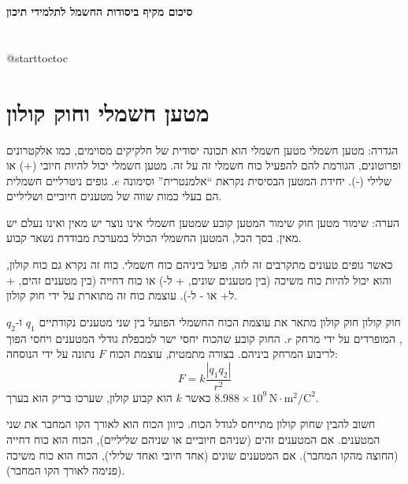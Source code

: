 \documentclass[12pt]{article}
\makeatletter
\newcommand{\enquote}[1]{\textquotedblleft #1\textquotedblright}
\renewcommand\tableofcontents{\section*{ \contentsname}
    @starttoc{toc}}
\makeatother
\begin{document}
\begin{center}
    \Large\bfseries סיכום מקיף ביסודות החשמל לתלמידי תיכון
\end{center}

\vspace{1em} %

\tableofcontents

\newpage %

\section{מטען חשמלי וחוק קולון}

\begin{definitionBox}{הגדרה: מטען חשמלי}
מטען חשמלי הוא תכונה יסודית של חלקיקים מסוימים, כמו אלקטרונים ופרוטונים, הגורמת להם להפעיל כוח חשמלי זה על זה. מטען חשמלי יכול להיות חיובי (+) או שלילי (-). יחידת המטען הבסיסית נקראת \enquote{אלמנטרית} וסימונה \(e\). גופים ניטרליים חשמלית הם בעלי כמות שווה של מטענים חיוביים ושליליים.
\end{definitionBox}

\begin{remarkBox}{הערה: שימור מטען}
חוק שימור המטען קובע שמטען חשמלי אינו נוצר יש מאין ואינו נעלם יש מאין. בסך הכל, המטען החשמלי הכולל במערכת מבודדת נשאר קבוע.
\end{remarkBox}

כאשר גופים טעונים מתקרבים זה לזה, פועל ביניהם כוח חשמלי. כוח זה נקרא גם כוח קולון, והוא יכול להיות כוח משיכה (בין מטענים שונים, + ל-) או כוח דחייה (בין מטענים זהים, + ל+ או - ל-). עוצמת כוח זה מתוארת על ידי חוק קולון.

\begin{lawBox}{חוק קולון}
חוק קולון מתאר את עוצמת הכוח החשמלי הפועל בין שני מטענים נקודתיים \(q_1\) ו-\(q_2\), המופרדים על ידי מרחק \(r\). החוק קובע שהכוח יחסי ישר למכפלת גודלי המטענים ויחסי הפוך לריבוע המרחק ביניהם.
בצורה מתמטית, עוצמת הכוח \(F\) נתונה על ידי הנוסחה:
\begin{equation*}
F = k \frac{|q_1 q_2|}{r^2}
\end{equation*}
כאשר \(k\) הוא קבוע קולון, שערכו בריק הוא בערך \(8.988 \times 10^9 \, \text{N} \cdot \text{m}^2/\text{C}^2\).
\end{lawBox}

חשוב להבין שחוק קולון מתייחס לגודל הכוח. כיוון הכוח הוא לאורך הקו המחבר את שני המטענים. אם המטענים זהים (שניהם חיוביים או שניהם שליליים), הכוח הוא כוח דחייה (החוצה מהקו המחבר). אם המטענים שונים (אחד חיובי ואחד שלילי), הכוח הוא כוח משיכה (פנימה לאורך הקו המחבר).
\end{document}
